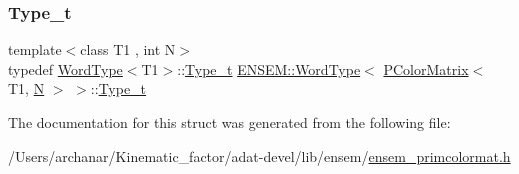 \subsubsection{\texorpdfstring{Type\_t}{Type\_t}\hspace{0.1cm}{\footnotesize\ttfamily [3/3]}}
{\footnotesize\ttfamily template$<$class T1 , int N$>$ \\
typedef \mbox{\hyperlink{structENSEM_1_1WordType}{Word\+Type}}$<$T1$>$\+::\mbox{\hyperlink{structENSEM_1_1WordType_3_01PColorMatrix_3_01T1_00_01N_01_4_01_4_a32aa3b6b38804a81d375ed7a84abe6c7}{Type\+\_\+t}} \mbox{\hyperlink{structENSEM_1_1WordType}{E\+N\+S\+E\+M\+::\+Word\+Type}}$<$ \mbox{\hyperlink{classENSEM_1_1PColorMatrix}{P\+Color\+Matrix}}$<$ T1, \mbox{\hyperlink{adat__devel_2lib_2hadron_2operator__name__util_8cc_a7722c8ecbb62d99aee7ce68b1752f337}{N}} $>$ $>$\+::\mbox{\hyperlink{structENSEM_1_1WordType_3_01PColorMatrix_3_01T1_00_01N_01_4_01_4_a32aa3b6b38804a81d375ed7a84abe6c7}{Type\+\_\+t}}}



The documentation for this struct was generated from the following file\+:\begin{DoxyCompactItemize}
\item 
/\+Users/archanar/\+Kinematic\+\_\+factor/adat-\/devel/lib/ensem/\mbox{\hyperlink{adat-devel_2lib_2ensem_2ensem__primcolormat_8h}{ensem\+\_\+primcolormat.\+h}}\end{DoxyCompactItemize}
